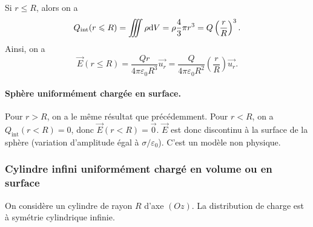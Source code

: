                 Si $r\leqslant R$, alors on a 
                \begin{equation}
                    Q_{\text{int}}(r\leqslant R)=\iiint \rho\mathrm{d} V=\rho\frac{4}{3}\pi r^{3}=Q\left(\frac{r}{R}\right)^{3}.
                \end{equation}
                Ainsi, on a 
                \begin{equation}
                    \boxed{
                        \vec{E}(r\leqslant R)=\frac{Qr}{4\pi\varepsilon_0 R^{3}}\vec{u_r}=\frac{Q}{4\pi\varepsilon_0 R^{2}}\left(\frac{r}{R}\right)\vec{u_r}.
                    }
                \end{equation}

            \paragraph{Sphère uniformément chargée en surface.}

                Pour $r>R$, on a le même résultat que précédemment. Pour $r<R$, on a $Q_{\text{int}}(r<R)=0$, donc $\vec{E}(r<R)=\vec{0}$. $\vec{E}$ est donc discontinu à la surface de la sphère (variation d'amplitude égal à $\sigma/\varepsilon_{0}$). C'est un modèle non physique.                

        \subsubsection{Cylindre infini uniformément chargé en volume ou en surface}

            On considère un cylindre de rayon $R$ d'axe $(Oz)$.
            La distribution de charge est à symétrie cylindrique \og infinie\fg. 


